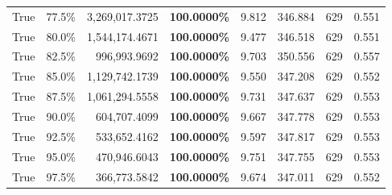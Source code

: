 \begin{table}[H]
\begin{tabular}{|m{}| m{}| r | R{0.13\textwidth}| R{0.09\textwidth}| R{0.09\textwidth}| R{0.09\textwidth}| R{0.11\textwidth}|}
True & 77.5\% & 3,269,017.3725 & \bfseries \color{red} 100.0000\% & 9.812 & 346.884 & 629 & 0.551 \\
True & 80.0\% & 1,544,174.4671 & \bfseries \color{red} 100.0000\% & 9.477 & 346.518 & 629 & 0.551 \\
True & 82.5\% & 996,993.9692 & \bfseries \color{red} 100.0000\% & 9.703 & 350.556 & 629 & 0.557 \\
True & 85.0\% & 1,129,742.1739 & \bfseries \color{red} 100.0000\% & 9.550 & 347.208 & 629 & 0.552 \\
True & 87.5\% & 1,061,294.5558 & \bfseries \color{red} 100.0000\% & 9.731 & 347.637 & 629 & 0.553 \\
True & 90.0\% & 604,707.4099 & \bfseries \color{red} 100.0000\% & 9.667 & 347.778 & 629 & 0.553 \\
True & 92.5\% & 533,652.4162 & \bfseries \color{red} 100.0000\% & 9.597 & 347.817 & 629 & 0.553 \\
True & 95.0\% & 470,946.6043 & \bfseries \color{red} 100.0000\% & 9.751 & 347.755 & 629 & 0.553 \\
True & 97.5\% & 366,773.5842 & \bfseries \color{red} 100.0000\% & 9.674 & 347.011 & 629 & 0.552 \\
\bottomrule
\end{tabular}
\end{table}
